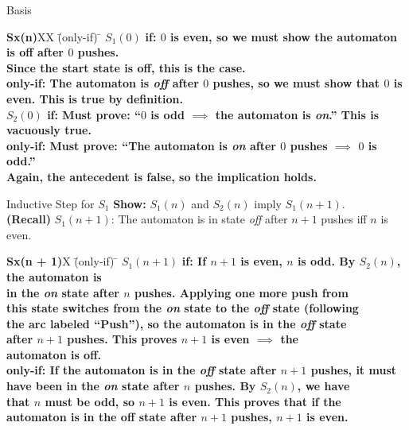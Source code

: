 \documentclass[style=sailor,size=12pt]{powerdot}
\begin{document}
\begin{wideslide}[bm=,toc=]{Basis}

\begin{tabbing}
{\bf Sx(n)}XX \=  (only-if) \= \kill
{\bf $S_1(0)$}  \>
           \bf{if:} \> 
           $0$ is even, so we must show the automaton is off after $0$ pushes.  \\
      \>\> Since the start state is off, this is the case.  \\[2ex]
      \>
     \bf{only-if:}\> 
          The automaton is {\em off\/} after $0$ pushes, so we must show that $0$ is\\ 
      \>\>   even. This is true by definition.   \\[4ex]
{\bf $S_2(0)$} \>
          \bf{if:} \> 
          Must prove: ``$0$ is odd $\implies$ the automaton is {\em
                   on\/}.'' This is\\
     \>\> vacuously true.  \\[2ex]
     \>
     \bf{only-if:} \> 
       Must prove: ``The automaton is {\em on\/} after $0$ pushes 
                   $\implies$ $0$ is odd.'' \\
     \>\> Again, the antecedent is false, so the implication holds.\\[2ex]
\end{tabbing}


\end{wideslide}

\begin{wideslide}[bm=,toc=]{Inductive Step for $S_1$}
{\bf Show:} $S_1(n)$ and $S_2(n)$ imply $S_1(n + 1)$.\\
{\bf (Recall)} $S_1(n+1)$: The automaton is in state \emph{off} after $n + 1$
pushes iff $n$ is even.  
\begin{tabbing}
{\bf Sx(n + 1)}X \=  (only-if) \= \kill
{\bf $S_1(n + 1)$}  \>
           \bf{if:} \> 
           If $n + 1$ is even, $n$ is odd. By $S_2(n)$, the automaton is \\
      \>\> in the \emph{on} state after $n$ pushes. Applying one more push from \\
      \>\> this state switches from the \emph{on} state to the \emph{off} state (following\\
      \>\> the arc labeled ``Push''), so the automaton is in the \emph{off} state \\
      \>\> after $n + 1$ pushes. This proves $n + 1$ is even $\implies$ the  \\
      \>\> automaton is off.
           \\[2ex]
      \>
     \bf{only-if:}\> 
           If the automaton is in the \emph{off} state after $n + 1$ pushes, it must \\
      \>\> have been in the \emph{on} state after $n$ pushes. By $S_2(n)$, we have\\
      \>\> that $n$ must be odd, so $n+1$ is even. This proves that if the \\
      \>\> automaton is in the off state after $n + 1$ pushes, $n+1$ is even.
           \\[2ex]
\end{tabbing}


\end{wideslide}
\end{document}
